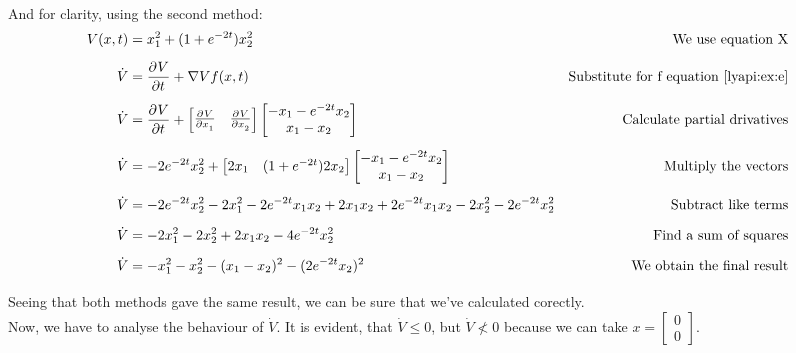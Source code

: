 {\begin{equation}
\begin{aligned}
        \end{aligned}
    \end{equation}
    And for clarity, using the second method:
    \begin{equation}
        \begin{aligned}
            V(x,t)&=x_1^{2} + (1+e^{-2t})x_2^{2}&\mbox{We use equation X}\\[1.25ex]
            \dot{V}&= \frac{\partial^{}V}{\partial t^{}}+\nabla V f(x,t) &\mbox{Substitute for f equation \ref{lyapi:ex:e}}\\[1.25ex]
            \dot{V}&= \frac{\partial^{}V}{\partial t^{}} + \begin{bmatrix}
                \frac{\partial^{}V}{\partial x_1^{}} & \frac{\partial^{}V}{\partial x_2^{}}
            \end{bmatrix} \begin{bmatrix}
                -x_1 -e^{-2t}x_2 \\
                x_1-x_2
            \end{bmatrix}&\mbox{Calculate partial drivatives}\\[1.25ex]
            \dot{V}&=-2e^{-2t}x_2^{2}+\begin{bmatrix}
                2x_1 & (1+e^{-2t})2x_2
            \end{bmatrix} \begin{bmatrix}
                -x_1 -e^{-2t}x_2   \\
                x_1-x_2
            \end{bmatrix}&\mbox{Multiply the vectors}\\[1.25ex]
            \dot{V}&=-2e^{-2t}x_2^{2}-2x_1^{2} -2e^{-2t}x_1x_2 + 2x_1x_2+2e^{-2t}x_1x_2-2x_2^{2}-2e^{-2t}x_2^{2}&\mbox{Subtract like terms}\\[1.25ex]
            \dot{V}&=-2x_1^{2}-2x_2^{2}+2x_1x_2 -4e^{-2t}x_2^{2}&\mbox{Find a sum of squares}\\[1.25ex]
            \dot{V}&=-x_1^{2}-x_2^{2} - (x_1-x_2)^{2} -(2e^{-2t}x_2)^{2}&\mbox{We obtain the final result}\\[1.25ex]
        \end{aligned}
    \end{equation}
    Seeing that both methods gave the same result, we can be sure that we've calculated corectly.\\
    Now, we have to analyse the behaviour of $\dot{V}$. It is evident, that $\dot{V} \le 0$, but $\dot{V} \not < 0$ because we can take $x=\begin{bmatrix}
        0  \\
        0
    \end{bmatrix}$.
}
